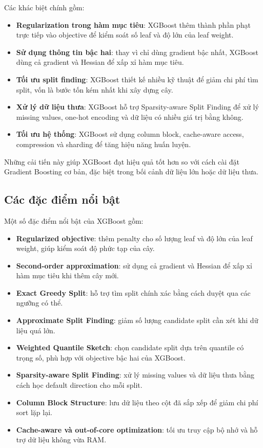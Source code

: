 Các khác biệt chính gồm:

\begin{itemize}
    \item \textbf{Regularization trong hàm mục tiêu}: XGBoost thêm thành phần phạt trực tiếp vào objective để kiểm soát số leaf và độ lớn của leaf weight.
    \item \textbf{Sử dụng thông tin bậc hai}: thay vì chỉ dùng gradient bậc nhất, XGBoost dùng cả gradient và Hessian để xấp xỉ hàm mục tiêu.
    \item \textbf{Tối ưu split finding}: XGBoost thiết kế nhiều kỹ thuật để giảm chi phí tìm split, vốn là bước tốn kém nhất khi xây dựng cây.
    \item \textbf{Xử lý dữ liệu thưa}: XGBoost hỗ trợ Sparsity-aware Split Finding để xử lý missing values, one-hot encoding và dữ liệu có nhiều giá trị bằng không.
    \item \textbf{Tối ưu hệ thống}: XGBoost sử dụng column block, cache-aware access, compression và sharding để tăng hiệu năng huấn luyện.
\end{itemize}

Những cải tiến này giúp XGBoost đạt hiệu quả tốt hơn so với cách cài đặt Gradient Boosting cơ bản, đặc biệt trong bối cảnh dữ liệu lớn hoặc dữ liệu thưa.

\subsection{Các đặc điểm nổi bật}

Một số đặc điểm nổi bật của XGBoost gồm:

\begin{itemize}
    \item \textbf{Regularized objective}: thêm penalty cho số lượng leaf và độ lớn của leaf weight, giúp kiểm soát độ phức tạp của cây.
    \item \textbf{Second-order approximation}: sử dụng cả gradient và Hessian để xấp xỉ hàm mục tiêu khi thêm cây mới.
    \item \textbf{Exact Greedy Split}: hỗ trợ tìm split chính xác bằng cách duyệt qua các ngưỡng có thể.
    \item \textbf{Approximate Split Finding}: giảm số lượng candidate split cần xét khi dữ liệu quá lớn.
    \item \textbf{Weighted Quantile Sketch}: chọn candidate split dựa trên quantile có trọng số, phù hợp với objective bậc hai của XGBoost.
    \item \textbf{Sparsity-aware Split Finding}: xử lý missing values và dữ liệu thưa bằng cách học default direction cho mỗi split.
    \item \textbf{Column Block Structure}: lưu dữ liệu theo cột đã sắp xếp để giảm chi phí sort lặp lại.
    \item \textbf{Cache-aware và out-of-core optimization}: tối ưu truy cập bộ nhớ và hỗ trợ dữ liệu không vừa RAM.
\end{itemize}

